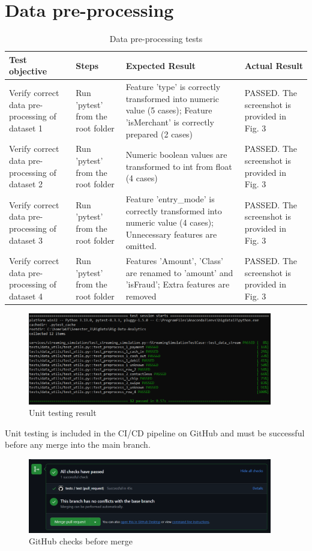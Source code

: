 \documentclass[12pt,a4paper, hidelinks]{article}
\begin{document}
\section{Data pre-processing}

\begin{table}[htbp]
\centering
\begin{tabular}{|p{3cm}|p{2cm}|p{4cm}|p{5cm}|}
\hline
\textbf{Test objective} & \textbf{Steps} & \textbf{Expected Result} & \textbf{Actual Result} \\
\hline
Verify correct data pre-processing of dataset 1 & Run 'pytest' from the root folder & Feature 'type' is correctly transformed into numeric value (5 cases); Feature 'isMerchant' is correctly prepared (2 cases) & PASSED. The screenshot is provided in Fig. 3 \\
\hline
Verify correct data pre-processing of dataset 2 & Run 'pytest' from the root folder & Numeric boolean values are transformed to int from float (4 cases) & PASSED. The screenshot is provided in Fig. 3 \\
\hline
Verify correct data pre-processing of dataset 3 & Run 'pytest' from the root folder & Feature 'entry\_mode' is correctly transformed into numeric value (4 cases); Unnecessary features are omitted. & PASSED. The screenshot is provided in Fig. 3 \\
\hline
Verify correct data pre-processing of dataset 4 & Run 'pytest' from the root folder & Features 'Amount', 'Class' are renamed to 'amount' and 'isFraud'; Extra features are removed & PASSED. The screenshot is provided in Fig. 3 \\
\hline
\end{tabular}
\caption{Data pre-processing tests}
\end{table}

\begin{figure}[htbp]
  \centering
  \includegraphics[width=0.95\textwidth]{images/unittests-M2.png}
  \caption{Unit testing result}
  \label{fig:sunset}
\end{figure}

Unit testing is included in the CI/CD pipeline on GitHub and must be successful before any merge into the main branch.

\begin{figure}[htbp]
  \centering
  \includegraphics[width=0.95\textwidth]{images/github-checks-M2.PNG}
  \caption{GitHub checks before merge}
  \label{fig:sunset}
\end{figure}
\end{document}
